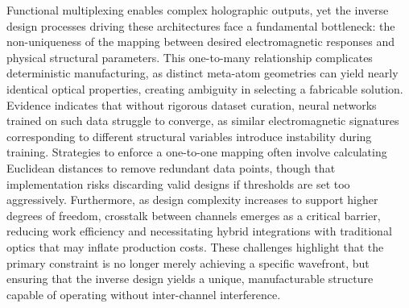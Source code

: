 \documentclass[11pt]{article}
\begin{document}
Functional multiplexing enables complex holographic outputs, yet the inverse design processes driving these architectures face a fundamental bottleneck: the non-uniqueness of the mapping between desired electromagnetic responses and physical structural parameters. This one-to-many relationship complicates deterministic manufacturing, as distinct meta-atom geometries can yield nearly identical optical properties, creating ambiguity in selecting a fabricable solution. Evidence indicates that without rigorous dataset curation, neural networks trained on such data struggle to converge, as similar electromagnetic signatures corresponding to different structural variables introduce instability during training. Strategies to enforce a one-to-one mapping often involve calculating Euclidean distances to remove redundant data points, though that implementation risks discarding valid designs if thresholds are set too aggressively. Furthermore, as design complexity increases to support higher degrees of freedom, crosstalk between channels emerges as a critical barrier, reducing work efficiency and necessitating hybrid integrations with traditional optics that may inflate production costs. These challenges highlight that the primary constraint is no longer merely achieving a specific wavefront, but ensuring that the inverse design yields a unique, manufacturable structure capable of operating without inter-channel interference. \citep{doi_10_1088_1361_6463_ad3e05_d24e0a0a} \citep{doi_10_1515_nanoph_2025_0269_b999ce93} \citep{doi_10_1038_s41467_026_76714_x_8ca5d39b}
\end{document}
